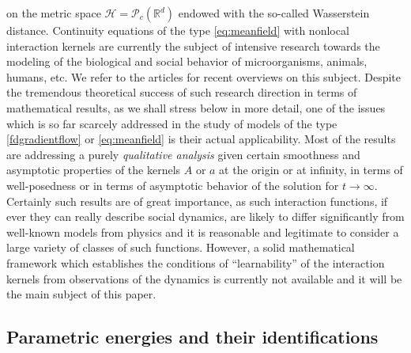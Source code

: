 on the metric space $\mathcal H =\mathcal P_c(\mathbb R^d)$ endowed with the so-called Wasserstein distance. Continuity equations of the type \eqref{eq:meanfield} with nonlocal interaction kernels are currently the subject of intensive research  towards the modeling of the biological and social behavior of microorganisms, animals, humans, etc. We refer to the  articles \cite{cafotove10,13-Carrillo-Choi-Hauray-MFL} for recent overviews on this subject. Despite the tremendous theoretical success of such research direction in terms of mathematical results, as we shall stress below in more detail, one of the issues which is so far scarcely addressed in the study of models of the type \eqref{fdgradientflow} or \eqref{eq:meanfield} is their actual applicability. Most of the results are addressing a purely {\it qualitative analysis} given certain smoothness and asymptotic properties of the kernels $A$ or $a$ at the origin or at infinity, in terms of well-posedness or in terms of asymptotic behavior of the solution for $t \to \infty$.  Certainly such results are of great importance, as such interaction functions, if ever they can really describe social dynamics,  are likely to differ significantly from well-known models from physics and it is reasonable and legitimate to consider a large variety of classes of such functions.
However, a solid mathematical framework which establishes the conditions of ``learnability'' of the interaction kernels from observations of the dynamics is currently not available and it will be the main subject of this paper.

\subsection{Parametric energies and their identifications}

